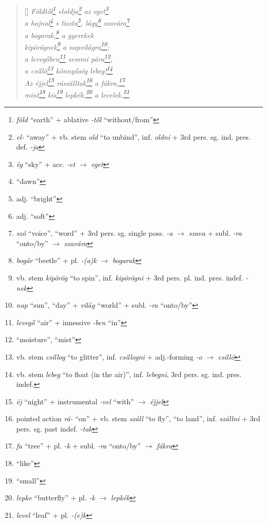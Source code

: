 \documentclass[a4paper,12pt,twoside,final]{book}
\begin{document}
\begin{verse}[\versewidth]
  \it
  Földtől\footnote{\emph{föld} ``earth'' +
  ablative \emph{-től} ``without/from''} eloldja\footnote{\emph{el-} ``away''
  + vb. stem \emph{old} ``to unbind'', inf. \emph{oldni} + 3rd
  pers. sg. ind. pres. def. \emph{-ja}} az eget\footnote{\emph{ég}
  ``sky'' + acc. \emph{-et} $\rightarrow$ \emph{eget}} \\
  a hajnal\footnote{``dawn''} s tiszta\footnote{adj. ``bright''},
  lágy\footnote{adj. ``soft''} szavára\footnote{\emph{szó} ``voice'',
  ``word'' + 3rd pers. sg. single poss. \emph{-a} $\rightarrow$
  \emph{szava} + subl. \emph{-ra} ``onto/by'' $\rightarrow$
  \emph{szavára}} \\

  a bogarak,\footnote{\emph{bogár} ``beetle'' + pl. \emph{-(a)k}
  $\rightarrow$ \emph{bogarak}} a gyerekek \\
  kipörögnek\footnote{vb. stem \emph{kipörög} ``to spin'',
  inf. \emph{kipörögni} + 3rd pers. pl. ind. pres. indef. \emph{-nek}}
  a napvilágra\footnote{\emph{nap} ``sun'', ``day'' + \emph{világ}
  ``world'' + subl. \emph{-ra} ``onto/by''}; \\
  a levegőben\footnote{\emph{levegő} ``air'' +
  innessive \emph{-ben} ``in''} semmi pára\footnote{``moisture'', ``mist''}, \\
  a csilló\footnote{vb. stem \emph{csillog} ``to glitter'',
  inf. \emph{csillogni} + adj.-forming \emph{-o} $\rightarrow$
  \emph{csilló}} könnyűség lebeg!\footnote{vb. stem \emph{lebeg} ``to
  float (in the air)'', inf. \emph{lebegni}, 3rd
  pers. sg. ind. pres. indef.} \\
  Az éjjel\footnote{\emph{éj} ``night'' + instrumental \emph{-vel}
  ``with'' $\rightarrow$ \emph{éjjel}} rászálltak\footnote{pointed
  action \emph{rá-} ``on'' + vb. stem \emph{száll} ``to fly'', ``to
  land'', inf. \emph{szállni} + 3rd pers. sg. past
  indef. \emph{-tak}} a fákra,\footnote{\emph{fa} ``tree'' +
  pl. \emph{-k} + subl. \emph{-ra} ``onto/by'' $\rightarrow$ \emph{fákra}} \\
  mint\footnote{``like''} kis\footnote{``small''} lepkék,\footnote{\emph{lepke}
  ``butterfly'' + pl. \emph{-k} $\rightarrow$ \emph{lepkék}} a
  levelek.\footnote{\emph{level} ``leaf'' + pl. \emph{-(e)k}}
\end{verse}

\end{document}
